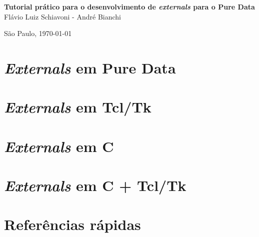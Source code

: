 \documentclass[10pt,a4paper]{report}
\newcommand{\externals}{\emph{externals}\xspace}
\newcommand{\Externals}{\emph{Externals}\xspace}
\begin{document}
\thispagestyle{empty}
\begin{center}
    \vspace*{2.3cm}
    \vskip 8cm
    \textbf{\Large{Tutorial prático para o desenvolvimento de \externals para o
Pure Data}}\\

    \vspace*{1.2cm}
    \vskip 5cm
    \Large{Flávio Luiz Schiavoni - André Bianchi}

    \vskip 5cm

    \vskip 0.5cm
    \normalsize{São Paulo, \today}
\end{center}

\tableofcontents



\part{\Externals em Pure Data}


\part{\Externals em Tcl/Tk}





\part{\Externals em C}








%
%

\part{\Externals em C + Tcl/Tk}




\part{Referências rápidas}

\end{document}
